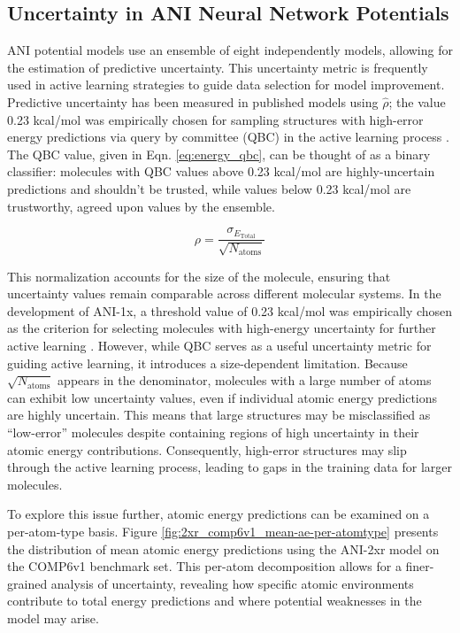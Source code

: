 \subsection{Uncertainty in ANI Neural Network Potentials}
\label{subsec:ANI_uncertainty}

ANI potential models use an ensemble of eight independently models, allowing for the estimation of predictive uncertainty.
This uncertainty metric is frequently used in active learning strategies to guide data selection for model improvement.
Predictive uncertainty has been measured in published models using $\hat{\rho}$; the value 0.23 kcal/mol was empirically chosen for sampling structures with high-error energy predictions via query by committee (QBC) in the active learning process \cite{ani-1x}.
The QBC value, given in Eqn. \ref{eq:energy_qbc}, can be thought of as a binary classifier: molecules with QBC values above 0.23 kcal/mol are highly-uncertain predictions and shouldn't be trusted, while values below 0.23 kcal/mol are trustworthy, agreed upon values by the ensemble.

\begin{equation}
\rho = \frac{\sigma_{E_{\text{Total}}}}{\sqrt{N_{\text{atoms}}}}
\label{eq:energy_qbc}
\end{equation}

This normalization accounts for the size of the molecule, ensuring that uncertainty values remain comparable across different molecular systems. 
In the development of ANI-1x, a threshold value of 0.23 kcal/mol was empirically chosen as the criterion for selecting molecules with high-energy uncertainty for further active learning \cite{ani-1x}.
However, while QBC serves as a useful uncertainty metric for guiding active learning, it introduces a size-dependent limitation. Because $\sqrt{N_\text{atoms}}$ appears in the denominator, molecules with a large number of atoms can exhibit low uncertainty values, even if individual atomic energy predictions are highly uncertain. 
This means that large structures may be misclassified as “low-error” molecules despite containing regions of high uncertainty in their atomic energy contributions. 
Consequently, high-error structures may slip through the active learning process, leading to gaps in the training data for larger molecules.

To explore this issue further, atomic energy predictions can be examined on a per-atom-type basis. 
Figure \ref{fig:2xr_comp6v1_mean-ae-per-atomtype} presents the distribution of mean atomic energy predictions using the ANI-2xr model on the COMP6v1 benchmark set. 
This per-atom decomposition allows for a finer-grained analysis of uncertainty, revealing how specific atomic environments contribute to total energy predictions and where potential weaknesses in the model may arise.

